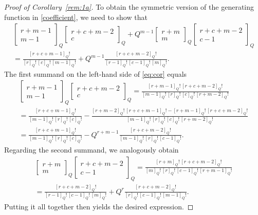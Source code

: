 \documentclass[12pt,reqno]{amsart}
\numberwithin{equation}{section}
\theoremstyle{definition}
\begin{document}
\begin{proof}[Proof of Corollary~\ref{rem:1a}]
To obtain the symmetric version of the generating function in \cref{coefficient}, we need to show that
\begin{multline}\label{eq:cor}
\begin{bmatrix} r+m-1 \\ m-1 \end{bmatrix}_Q\begin{bmatrix} r+c+m-2 \\ c\end{bmatrix}_Q
+Q^{m-1}\begin{bmatrix} r+m \\ m \end{bmatrix}_Q
\begin{bmatrix} r+c+m-2 \\ c-1 \end{bmatrix}_Q\\
= \frac {[r+c+m-1]_Q!} {[r]_Q!\,[c]_Q!\,[m-1]_Q!}
+Q^{m-1}\frac {[r+c+m-2]_Q!} {[r-1]_Q!\,[c-1]_Q!\,[m]_Q!}.
\end{multline}
The first summand on the left-hand side of \eqref{eq:cor} equals
\begin{multline*}
	\begin{bmatrix} r+m-1 \\ m-1 \end{bmatrix}_Q\begin{bmatrix} r+c+m-2 \\ c\end{bmatrix}_Q = \frac {[r+m-1]_Q!\,[r+c+m-2]_Q!} {[m-1]_Q!\,[r]_Q!\,[c]_Q!\,[r+m-2]_Q!}\\
	= \frac {[r+c+m-1]_Q!} {[m-1]_Q!\,[r]_Q!\,[c]_Q!} - \frac {[r+m-2]_Q!\,[r+c+m-1]_Q!-[r+m-1]_Q!\,[r+c+m-2]_Q!} {[m-1]_Q!\,[r]_Q!\,[c]_Q!\,[r+m-2]_Q!}\\
	= \frac {[r+c+m-1]_Q!} {[m-1]_Q!\,[r]_Q!\,[c]_Q!} - Q^{r+m-1}\frac {[r+c+m-2]_Q!} {[m-1]_Q!\,[r]_Q!\,[c-1]_Q!}.
\end{multline*}
Regarding the second summand, we analogously obtain
\begin{multline*}
	\begin{bmatrix} r+m \\ m \end{bmatrix}_Q
	\begin{bmatrix} r+c+m-2 \\ c-1 \end{bmatrix}_Q=\frac {[r+m]_Q!\,[r+c+m-2]_Q!} {[m]_Q!\,[r]_Q!\,[c-1]_Q!\,[r+m-1]_Q!}\\
	=\frac {[r+c+m-2]_Q!} {[r-1]_Q!\,[c-1]_Q!\,[m]_Q!} + Q^r \frac {[r+c+m-2]_Q!} {[r]_Q!\,[c-1]_Q!\,[m-1]_Q!}.
\end{multline*}
Putting it all together then yields the desired expression.
\end{proof}
\end{document}
